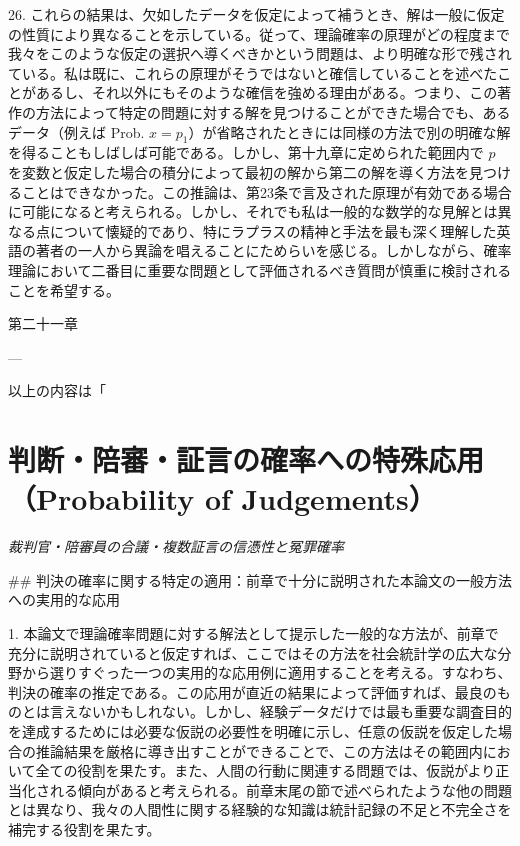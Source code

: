 \documentclass[a4paper,11pt,openany]{ltjsbook}
\begin{document}
26. これらの結果は、欠如したデータを仮定によって補うとき、解は一般に仮定の性質により異なることを示している。従って、理論確率の原理がどの程度まで我々をこのような仮定の選択へ導くべきかという問題は、より明確な形で残されている。私は既に、これらの原理がそうではないと確信していることを述べたことがあるし、それ以外にもそのような確信を強める理由がある。つまり、この著作の方法によって特定の問題に対する解を見つけることができた場合でも、あるデータ（例えば Prob. $x = p_1$）が省略されたときには同様の方法で別の明確な解を得ることもしばしば可能である。しかし、第十九章に定められた範囲内で $p$ を変数と仮定した場合の積分によって最初の解から第二の解を導く方法を見つけることはできなかった。この推論は、第23条で言及された原理が有効である場合に可能になると考えられる。しかし、それでも私は一般的な数学的な見解とは異なる点について懐疑的であり、特にラプラスの精神と手法を最も深く理解した英語の著者の一人から異論を唱えることにためらいを感じる。しかしながら、確率理論において二番目に重要な問題として評価されるべき質問が慎重に検討されることを希望する。

第二十一章

---

以上の内容は「%

\newpage

\chapter{判断・陪審・証言の確率への特殊応用（Probability of Judgements）}
\label{ch:xxi}

\begin{center}
\large\textit{裁判官・陪審員の合議・複数証言の信憑性と冤罪確率}
\end{center}
\vspace{4mm}

\#\# 判決の確率に関する特定の適用：前章で十分に説明された本論文の一般方法への実用的な応用

1. 本論文で理論確率問題に対する解法として提示した一般的な方法が、前章で充分に説明されていると仮定すれば、ここではその方法を社会統計学の広大な分野から選りすぐった一つの実用的な応用例に適用することを考える。すなわち、判決の確率の推定である。この応用が直近の結果によって評価すれば、最良のものとは言えないかもしれない。しかし、経験データだけでは最も重要な調査目的を達成するためには必要な仮説の必要性を明確に示し、任意の仮説を仮定した場合の推論結果を厳格に導き出すことができることで、この方法はその範囲内において全ての役割を果たす。また、人間の行動に関連する問題では、仮説がより正当化される傾向があると考えられる。前章末尾の節で述べられたような他の問題とは異なり、我々の人間性に関する経験的な知識は統計記録の不足と不完全さを補完する役割を果たす。
\end{document}
